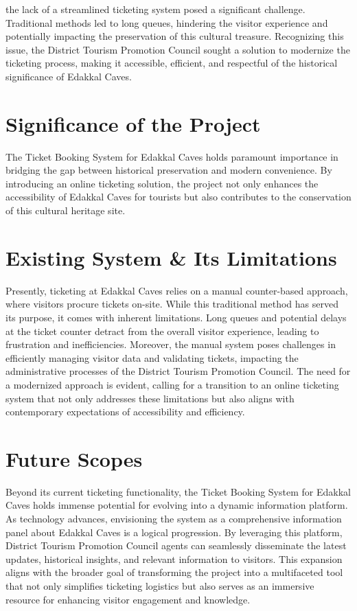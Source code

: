 \documentclass[12pt,a4paper]{report}
\begin{document}
the lack of a streamlined ticketing system posed a significant challenge. Traditional methods led to long queues, hindering the visitor experience and potentially impacting the preservation of this cultural treasure. Recognizing this issue, the District Tourism Promotion Council sought a solution to modernize the ticketing process, making it accessible, efficient, and respectful of the historical significance of Edakkal Caves.

\section{Significance of the Project}

The Ticket Booking System for Edakkal Caves holds paramount importance in bridging the gap between historical preservation and modern convenience. By introducing an online ticketing solution, the project not only enhances the accessibility of Edakkal Caves for tourists but also contributes to the conservation of this cultural heritage site.

\section{Existing System \& Its Limitations}

Presently, ticketing at Edakkal Caves relies on a manual counter-based approach, where visitors procure tickets on-site. While this traditional method has served its purpose, it comes with inherent limitations. Long queues and potential delays at the ticket counter detract from the overall visitor experience, leading to frustration and inefficiencies. Moreover, the manual system poses challenges in efficiently managing visitor data and validating tickets, impacting the administrative processes of the District Tourism Promotion Council. The need for a modernized approach is evident, calling for a transition to an online ticketing system that not only addresses these limitations but also aligns with contemporary expectations of accessibility and efficiency.

\section{Future Scopes}

Beyond its current ticketing functionality, the Ticket Booking System for Edakkal Caves holds immense potential for evolving into a dynamic information platform. As technology advances, envisioning the system as a comprehensive information panel about Edakkal Caves is a logical progression. By leveraging this platform, District Tourism Promotion Council agents can seamlessly disseminate the latest updates, historical insights, and relevant information to visitors. This expansion aligns with the broader goal of transforming the project into a multifaceted tool that not only simplifies ticketing logistics but also serves as an immersive resource for enhancing visitor engagement and knowledge.
\end{document}
